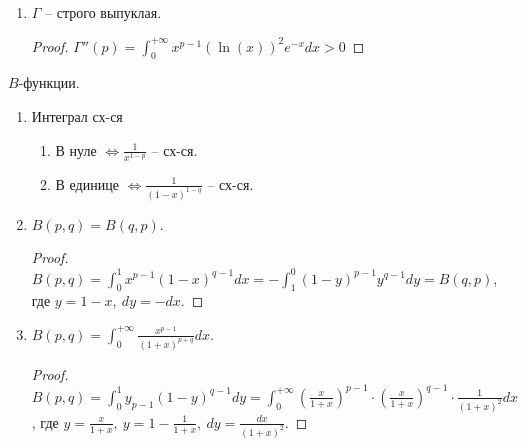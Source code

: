 \begin{properties}
\begin{enumerate}
{            \begin{proof}
                Надо обосновать дифф. под знаком интеграла.
                
                $0 < a \leq p \leq b$
                
                \begin{enumerate}
                    \item {
                        $0 \leq x \leq 1$:

                        $x^{a-1} |\ln(x)|^{n} e^{-x}$
                    }
                    \item {
                        $1 \leq x$:

                        $x^{b-1} |\ln(x)|^{n} e^{-x} \leq x^{n + b} e^{-e}$
                    }
                \end{enumerate}
            \end{proof}
        }
        \item {
            $\Gamma$ -- строго выпуклая.

            \begin{proof}
                $\Gamma''(p) = \int_{0}^{+\infty} { x^{p-1} (\ln(x))^2 e^{-x} dx } > 0$
            \end{proof}
        }
    \end{enumerate}
\end{properties}

\begin{properties}
    $B$-функции.

    \begin{enumerate}
        \item {
            Интеграл сх-ся 

            \begin{enumerate}
                \item В нуле $\Leftrightarrow \frac{1}{x^{1-p}}$ -- сх-ся.
                \item В единице $\Leftrightarrow \frac{1}{(1-x)^{1-q}}$ -- сх-ся.
            \end{enumerate}
        }
        \item {
            $B(p, q) = B(q, p)$.

            \begin{proof}
                $B(p, q) = \int_{0}^{1} { x^{p-1} (1-x)^{q-1} dx } = - \int_{1}^{0} { (1-y)^{p-1} y^{q-1} dy } = B(q, p)$, где $y = 1 - x, \ dy = -dx$.
            \end{proof}
        }
        \item {
            $B(p, q) = \int_{0}^{+\infty} { \frac{x^{p-1}}{(1+x)^{p+q}} dx }$.

            \begin{proof}
                $B(p, q) = \int_{0}^{1} { y_{p-1} (1-y)^{q-1} dy } = \int_{0}^{+\infty} { \left( \frac{x}{1+x} \right)^{p-1} \cdot \left( \frac{x}{1+x} \right)^{q-1} \cdot \frac{1}{(1+x)^2} dx }$, где $y = \frac{x}{1+x}, \ y = 1 - \frac{1}{1+x}, \ dy = \frac{dx}{(1+x)^2}$.
            \end{proof}
        }
    \end{enumerate}
\end{properties}

